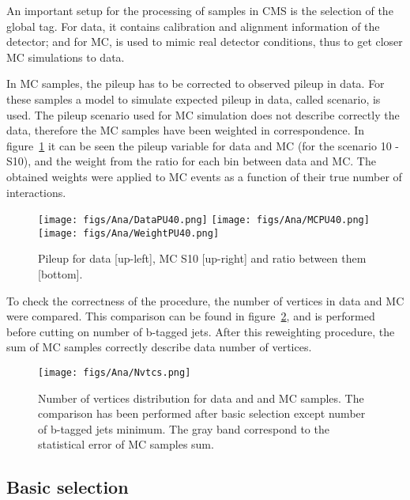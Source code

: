 An important setup for the processing of samples in CMS is the selection of the global tag. For data, it contains calibration and alignment information of the detector; and for MC, is used to mimic real detector conditions, thus to get closer MC simulations to data.

In MC samples, the pileup has to be corrected to observed pileup in data. For these samples a model to simulate expected pileup in data, called scenario, is used. The pileup scenario used for MC simulation does not describe correctly the data, therefore the MC samples have been weighted in correspondence. In figure~\ref{fig:PU_distros} it can be seen the pileup variable for data and MC (for the scenario 10 - S10), and the weight from the ratio for each bin between data and MC. The obtained weights were applied to MC events as a function of their true number of interactions.

\begin{figure}[!Hhtbp]
  \begin{center}
    \texttt{[image: figs/Ana/DataPU40.png]}
    \texttt{[image: figs/Ana/MCPU40.png]}
    \texttt{[image: figs/Ana/WeightPU40.png]}
    \caption{Pileup for data [up-left], MC S10 [up-right] and ratio between them [bottom].}
    \label{fig:PU_distros}
  \end{center}
\end{figure}

To check the correctness of the procedure, the number of vertices in data and MC were compared. This comparison can be found in figure~\ref{fig:NV_dataMC}, and is performed before cutting on number of b-tagged jets. After this reweighting procedure, the sum of MC samples correctly describe data number of vertices.

\begin{figure}[!Hhtbp]
  \begin{center}
    \texttt{[image: figs/Ana/Nvtcs.png]}
    \caption{Number of vertices distribution for data and and MC samples. The comparison has been performed after basic selection except number of b-tagged jets minimum. The gray band correspond to the statistical error of MC samples sum.}
    \label{fig:NV_dataMC}
  \end{center}
\end{figure}

\subsection{Basic selection}

